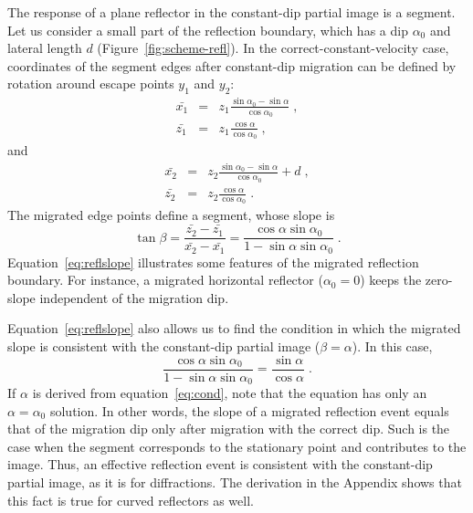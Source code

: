The response of a plane reflector in the constant-dip partial image is a segment. Let us consider
a small part of the reflection boundary, which has a dip $\alpha_0$ and lateral length $d$ (Figure~\ref{fig:scheme-refl}).
In the correct-constant-velocity case, coordinates of the segment edges after constant-dip migration can be defined by
rotation around escape points $y_1$ and $y_2$:
\begin{eqnarray}
\label{eq:p1x}
  \bar{x_1} & = & z_1 \frac{\sin \alpha_0 - \sin \alpha}{\cos \alpha_0}\;, \\
\label{eq:p1z}
  \bar{z_1} & = & z_1 \frac{\cos \alpha}{\cos \alpha_0}\;,
\end{eqnarray}
and
\begin{eqnarray}
\label{eq:p2x}
  \bar{x_2} & = & z_2 \frac{\sin \alpha_0 - \sin \alpha}{\cos \alpha_0} + d\;, \\
\label{eq:p2z}
  \bar{z_2} & = & z_2 \frac{\cos \alpha}{\cos \alpha_0}\;.
\end{eqnarray}
The migrated edge points define a segment, whose slope is
\begin{equation}
\label{eq:reflslope}
\tan \beta = \frac {\bar{z_2}-\bar{z_1}}{\bar{x_2} - \bar{x_1}} = \frac{\cos \alpha \sin \alpha_0}{1 - \sin \alpha \sin \alpha_0}\;.
\end{equation}
Equation~\ref{eq:reflslope} illustrates some features of the migrated reflection boundary. For instance, a migrated horizontal
reflector ($\alpha_0 = 0$) keeps the zero-slope independent of the migration dip.


Equation~\ref{eq:reflslope} also allows us to find the condition in which the migrated slope is consistent with the constant-dip
partial image ($\beta=\alpha$). In this case,
\begin{equation}
\label{eq:cond}
\frac{\cos \alpha \sin \alpha_0}{1 - \sin \alpha \sin \alpha_0} = \frac {\sin \alpha}{\cos \alpha}\;.
\end{equation}
If $\alpha$ is derived from equation~\ref{eq:cond}, note that the equation has only an $\alpha=\alpha_0$ solution. In other words,
the slope of a migrated reflection event equals that of the migration dip only after migration with the correct dip. Such is the case when
the segment corresponds to the stationary point and contributes to the image. Thus, an effective reflection event is consistent
with the constant-dip partial image, as it is for diffractions. The derivation in the Appendix shows that this fact is true for curved reflectors
as well.

